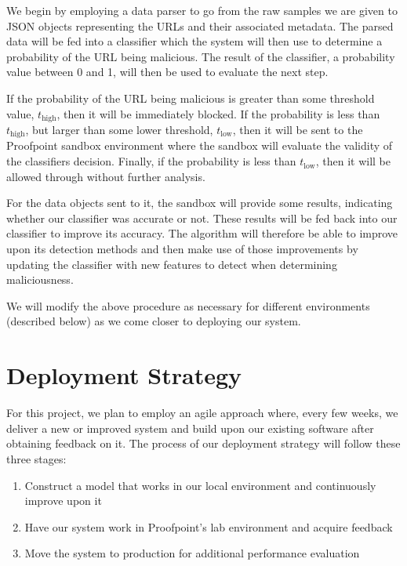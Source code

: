 \documentclass[cs,proposal]{hmcclinic}
\begin{document}
We begin by employing a data parser to go from the raw samples we are given to JSON objects representing the URLs and their associated metadata. The parsed data will be fed into a classifier which the system will then use to determine a probability of the URL being malicious. The result of the classifier, a probability value between 0 and 1, will then be used to evaluate the next step.

If the probability of the URL being malicious is greater than some threshold value, $t_{\text{high}}$, then it will be immediately blocked. If the probability is less than $t_{\text{high}}$, but larger than some lower threshold, $t_{\text{low}}$, then it will be sent to the Proofpoint sandbox environment where the sandbox will evaluate the validity of the classifiers decision. Finally, if the probability is less than $t_{\text{low}}$, then it will be allowed through without further analysis.

For the data objects sent to it, the sandbox will provide some results, indicating whether our classifier was accurate or not. These results will be fed back into our classifier to improve its accuracy. The algorithm will therefore be able to improve upon its detection methods and then make use of those improvements by updating the classifier with new features to detect when determining maliciousness.

We will modify the above procedure as necessary for different environments (described below) as we come closer to deploying our system.


\section{Deployment Strategy}

For this project, we plan to employ an agile approach where, every few weeks, we deliver a new or improved system and build upon our existing software after obtaining feedback on it. The process of our deployment strategy will follow these three stages:

\begin{enumerate} \itemsep0em
\item Construct a model that works in our local environment and continuously improve upon it
\item Have our system work in Proofpoint's lab environment and acquire feedback
\item Move the system to production for additional performance evaluation
\end{enumerate}
\end{document}
